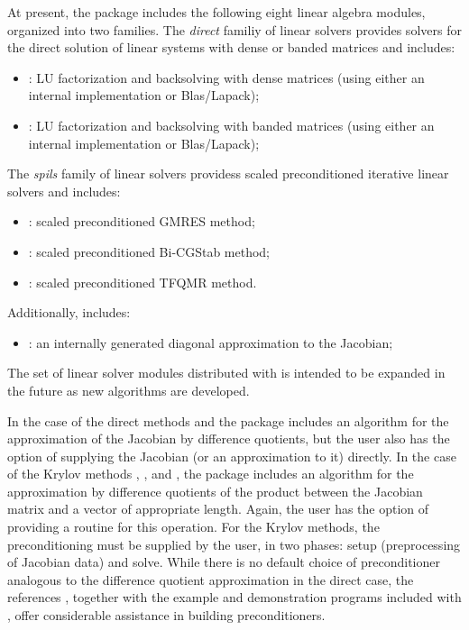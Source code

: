At present, the package includes the following eight {\cvode} linear algebra
modules, organized into two families. The {\em direct} familiy of linear
solvers provides solvers for the direct solution of linear systems with
dense or banded matrices and includes:
\begin{itemize} 
\item {\cvdense}: LU factorization and backsolving with dense matrices 
  (using either an internal implementation or Blas/Lapack); 
\item {\cvband}: LU factorization and backsolving with banded matrices 
  (using either an internal implementation or Blas/Lapack); 
\end{itemize}
The {\em spils} family of linear solvers providess scaled preconditioned
iterative linear solvers and includes:
\begin{itemize} 
\item {\cvspgmr}: scaled preconditioned GMRES method;
\item {\cvspbcg}: scaled preconditioned Bi-CGStab method;
\item {\cvsptfqmr}: scaled preconditioned TFQMR method.
\end{itemize}
Additionally, {\cvode} includes:
\begin{itemize}
\item {\cvdiag}: an internally generated diagonal approximation to the 
  Jacobian; 
\end{itemize}
The set of linear solver modules distributed with {\cvode} is intended to be expanded in the
future as new algorithms are developed.

In the case of the direct methods {\cvdense} and {\cvband}
the package includes an algorithm for the approximation of the Jacobian by difference
quotients, but the user also has the option of supplying the Jacobian
(or an approximation to it) directly. In the case of the Krylov methods
{\cvspgmr}, {\cvspbcg}, and {\cvsptfqmr}, the package includes an algorithm for
the approximation by difference quotients of the product between the Jacobian
matrix and a vector of appropriate length. Again, the user has the option of
providing a routine for this operation.
For the Krylov methods, 
the preconditioning must be supplied by the user, in two phases: 
setup (preprocessing of Jacobian data) and solve.
While there is no default
choice of preconditioner analogous to the difference quotient
approximation in the direct case, the references
\cite{BrHi:89,Byr:92}, together with
the example and demonstration programs included with {\cvode}, offer
considerable assistance in building preconditioners.

